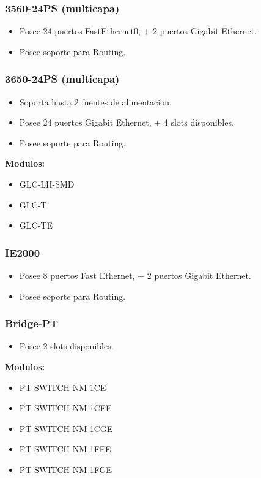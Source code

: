 \documentclass{article}
\begin{document}
\subsubsection{3560-24PS (multicapa)}
\begin{itemize}
    \item Posee 24 puertos FastEthernet0, + 2 puertos Gigabit Ethernet.
    \item Posee soporte para Routing.
\end{itemize}

\subsubsection{3650-24PS (multicapa)}
\begin{itemize}
    \item Soporta hasta 2 fuentes de alimentacion.
    \item Posee 24 puertos Gigabit Ethernet, + 4 slots disponibles.
    \item Posee soporte para Routing.
\end{itemize}
\textbf{Modulos:}
\begin{itemize}
    \item GLC-LH-SMD
    \item GLC-T
    \item GLC-TE
\end{itemize}

\subsubsection{IE2000}
\begin{itemize}
    \item Posee 8 puertos Fast Ethernet, + 2 puertos Gigabit Ethernet.
    \item Posee soporte para Routing.
\end{itemize}

\subsubsection{Bridge-PT}
\begin{itemize}
    \item Posee 2 slots disponibles.
\end{itemize}
\textbf{Modulos:}
\begin{itemize}
    \item PT-SWITCH-NM-1CE
    \item PT-SWITCH-NM-1CFE
    \item PT-SWITCH-NM-1CGE
    \item PT-SWITCH-NM-1FFE
    \item PT-SWITCH-NM-1FGE
\end{itemize}
\end{document}
